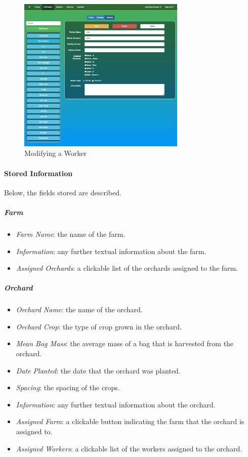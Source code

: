 \documentclass[11pt]{article}
\begin{document}
\begin{figure}
 \centering
 \includegraphics[width=8cm, keepaspectratio]{Images/UsingSystem/WebWorkerEdit.png}
 \caption{Modifying a Worker}
 \label{InformationModJoe}
\end{figure}

\paragraph{Stored Information}
Below, the fields stored are described.
\subparagraph{Farm}
\begin{itemize}
 \item \textit{Farm Name}: the name of the farm.
 \item \textit{Information}: any further textual information about the farm.
 \item \textit{Assigned Orchards}: a clickable list of the orchards assigned to the farm.
\end{itemize}

\subparagraph{Orchard}
\begin{itemize}
 \item \textit{Orchard Name}: the name of the orchard.
\item \textit{Orchard Crop}: the type of crop grown in the orchard.
\item \textit{Mean Bag Mass}: the average mass of a bag that is harvested from the orchard.
\item \textit{Date Planted}: the date that the orchard was planted.
\item \textit{Spacing}: the spacing of the crops.
\item \textit{Information}: any further textual information about the orchard.
\item \textit{Assigned Farm}: a clickable button indicating the farm that the orchard is assigned to.
\item \textit{Assigned Workers}: a clickable list of the workers assigned to the orchard.
\end{itemize}
\end{document}
